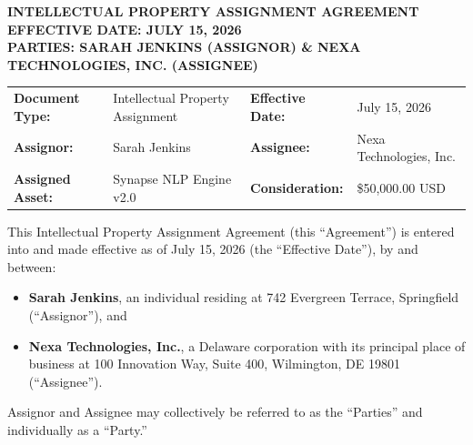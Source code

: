 \documentclass[11pt,letterpaper]{article}
\begin{document}
\thispagestyle{firstpage}

\begin{tcolorbox}[
  colback=legalbg,
  colframe=legalnavy,
  arc=0mm,
  leftrule=4pt,
  rightrule=0pt,
  toprule=0pt,
  bottomrule=0pt,
  boxsep=10pt,
  left=12pt,
  right=12pt,
  top=12pt,
  bottom=12pt
]
  {\fontsize{18}{22}\selectfont\color{legalnavy}\sffamily\bfseries INTELLECTUAL PROPERTY ASSIGNMENT AGREEMENT}\\[8pt]
  {\fontsize{10}{13}\selectfont\color{legalslate}\sffamily\bfseries EFFECTIVE DATE: JULY 15, 2026}\\[4pt]
  {\fontsize{10}{13}\selectfont\color{legalslate}\sffamily\bfseries PARTIES: SARAH JENKINS (ASSIGNOR) \& NEXA TECHNOLOGIES, INC. (ASSIGNEE)}
\end{tcolorbox}

\vspace{1.2em}

\begin{tcolorbox}[
  colback=legalbg,
  colframe=legalborder,
  arc=2mm,
  toprule=1pt,
  bottomrule=1pt,
  leftrule=1pt,
  rightrule=1pt,
  boxsep=6pt,
  left=8pt,
  right=8pt,
  top=6pt,
  bottom=6pt
]
  \sffamily
  \fontsize{9}{11}\selectfont
  \begin{tabularx}{\textwidth}{@{}l X l X@{}}
    \textbf{Document Type:} & Intellectual Property Assignment & \textbf{Effective Date:} & July 15, 2026 \\
    \textbf{Assignor:} & Sarah Jenkins & \textbf{Assignee:} & Nexa Technologies, Inc. \\
    \textbf{Assigned Asset:} & Synapse NLP Engine v2.0 & \textbf{Consideration:} & \$50,000.00 USD \\
  \end{tabularx}
\end{tcolorbox}

\vspace{1.2em}

This Intellectual Property Assignment Agreement (this ``Agreement'') is entered into and made effective as of July 15, 2026 (the ``Effective Date''), by and between:
\begin{itemize}
  \item \textbf{Sarah Jenkins}, an individual residing at 742 Evergreen Terrace, Springfield (``Assignor''), and
  \item \textbf{Nexa Technologies, Inc.}, a Delaware corporation with its principal place of business at 100 Innovation Way, Suite 400, Wilmington, DE 19801 (``Assignee'').
\end{itemize}
Assignor and Assignee may collectively be referred to as the ``Parties'' and individually as a ``Party.''









\end{document}
